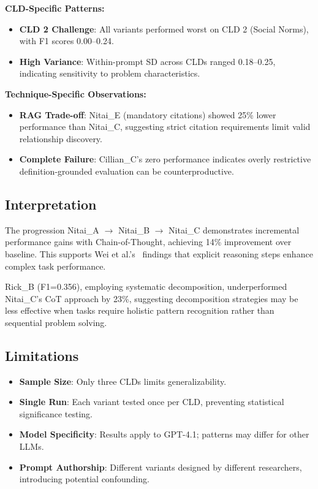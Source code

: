 \textbf{CLD-Specific Patterns:}
\begin{itemize}[noitemsep]
    \item \textbf{CLD 2 Challenge}: All variants performed worst on CLD 2 (Social Norms), with F1 scores 0.00--0.24.
    \item \textbf{High Variance}: Within-prompt SD across CLDs ranged 0.18--0.25, indicating sensitivity to problem characteristics.
\end{itemize}

\textbf{Technique-Specific Observations:}
\begin{itemize}[noitemsep]
    \item \textbf{RAG Trade-off}: Nitai\_E (mandatory citations) showed 25\% lower performance than Nitai\_C, suggesting strict citation requirements limit valid relationship discovery.
    \item \textbf{Complete Failure}: Cillian\_C's zero performance indicates overly restrictive definition-grounded evaluation can be counterproductive.
\end{itemize}

\subsection{Interpretation}

The progression Nitai\_A $\rightarrow$ Nitai\_B $\rightarrow$ Nitai\_C demonstrates incremental performance gains with Chain-of-Thought, achieving 14\% improvement over baseline. This supports Wei et al.'s~\cite{wei2022chain} findings that explicit reasoning steps enhance complex task performance.

Rick\_B (F1=0.356), employing systematic decomposition, underperformed Nitai\_C's CoT approach by 23\%, suggesting decomposition strategies may be less effective when tasks require holistic pattern recognition rather than sequential problem solving.

\subsection{Limitations}

\begin{itemize}[noitemsep]
    \item \textbf{Sample Size}: Only three CLDs limits generalizability.
    \item \textbf{Single Run}: Each variant tested once per CLD, preventing statistical significance testing.
    \item \textbf{Model Specificity}: Results apply to GPT-4.1; patterns may differ for other LLMs.
    \item \textbf{Prompt Authorship}: Different variants designed by different researchers, introducing potential confounding.
\end{itemize}

